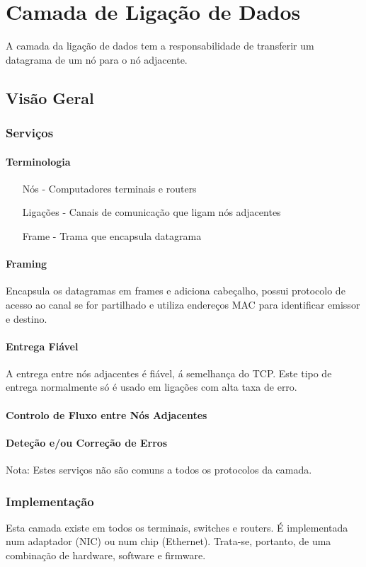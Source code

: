 \documentclass[10pt,a4paper]{report}
\begin{document}
\chapter{Camada de Ligação de Dados}
A camada da ligação de dados tem a responsabilidade de transferir um datagrama de um nó para o nó adjacente.
\minitoc 
\section{Visão Geral}
\subsection{Serviços}
\subsubsection{Terminologia}
\begin{itemize}
\item[Nós] - Computadores terminais e routers
\item[Ligações] - Canais de comunicação que ligam nós adjacentes
\item[Frame] - Trama que encapsula datagrama
\end{itemize}
\subsubsection{Framing}
Encapsula os datagramas em frames e adiciona cabeçalho, possui protocolo de acesso ao canal se for partilhado e utiliza endereços MAC para identificar emissor e destino.
\subsubsection{Entrega Fiável}
A entrega entre nós adjacentes é fiável, á semelhança do TCP. Este tipo de entrega normalmente só é usado em ligações com alta taxa de erro.
\subsubsection{Controlo de Fluxo entre Nós Adjacentes}
\subsubsection{Deteção e/ou Correção de Erros}
Nota: Estes serviços não são comuns a todos os protocolos da camada.
\subsection{Implementação}
Esta camada existe em todos os terminais, switches e routers. É implementada num adaptador (NIC) ou num chip (Ethernet). Trata-se, portanto, de uma combinação de hardware, software e firmware.
\end{document}
